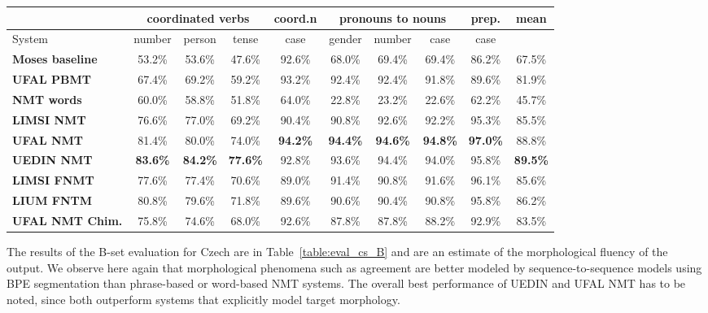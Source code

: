 \documentclass[11pt,letterpaper,final,nohyperref]{article}
\begin{document}
\begin{table*}[tb] %
\begin{center}
\small
\begin{tabular}{ l|ccc|c|ccc|c||c }
\hline
& \multicolumn{3}{c}{\textbf{coordinated verbs}} & \multicolumn{1}{c}{\textbf{coord.n}} & \multicolumn{3}{c}{\textbf{pronouns to nouns}} & \multicolumn{1}{c}{\textbf{prep.}} & \multicolumn{1}{c}{\textbf{mean}}\\
\hline
System & number & person & tense & case & gender & number & case & case & \\
\hline
\textbf{Moses baseline}  & 53.2\% & 53.6\% & 47.6\% & 92.6\% & 68.0\% & 69.4\% & 69.4\% & 86.2\% & 67.5\% \\
\textbf{UFAL PBMT}       & 67.4\% & 69.2\% & 59.2\% & 93.2\% & 92.4\% & 92.4\% & 91.8\% & 89.6\% & 81.9\% \\ 
\textbf{NMT words}       & 60.0\% & 58.8\% & 51.8\% & 64.0\% & 22.8\% & 23.2\% & 22.6\% & 62.2\% & 45.7\% \\
\textbf{LIMSI NMT}       & 76.6\% & 77.0\% & 69.2\% & 90.4\% & 90.8\% & 92.6\% & 92.2\% & 95.3\% & 85.5\% \\
\textbf{UFAL NMT}        & 81.4\% & 80.0\% & 74.0\% & \textbf{94.2\%} & \textbf{94.4\%} & \textbf{94.6\%} & \textbf{94.8\%} & \textbf{97.0\%} & 88.8\% \\
\textbf{UEDIN NMT}       & \textbf{83.6\%} & \textbf{84.2\%} & \textbf{77.6\%} & 92.8\% & 93.6\% & 94.4\% & 94.0\% & 95.8\% & \textbf{89.5\%} \\
\textbf{LIMSI FNMT}      & 77.6\% & 77.4\% & 70.6\% & 89.0\% & 91.4\% & 90.8\% & 91.6\% & 96.1\% & 85.6\% \\
\textbf{LIUM FNTM}       & 80.8\% & 79.6\% & 71.8\% & 89.6\% & 90.6\% & 90.4\% & 90.8\% & 95.8\% & 86.2\% \\
\textbf{UFAL NMT Chim.}  & 75.8\% & 74.6\% & 68.0\% & 92.6\% & 87.8\% & 87.8\% & 88.2\% & 92.9\% & 83.5\% \\
\hline
 \end{tabular} 
\caption{\label{table:eval_cs_B} Sentence pair evaluation for English-to-Czech (B-set).}
\end{center}
\end{table*}


The results of the B-set evaluation for Czech are in Table~\ref{table:eval_cs_B}
and are an estimate of the morphological fluency of the output. We observe here again
that morphological phenomena such as agreement are better modeled by sequence-to-sequence models
using BPE segmentation than phrase-based or word-based NMT systems.
The overall best
performance of UEDIN and UFAL NMT has to be noted, since both outperform systems that explicitly model target
morphology.
\end{document}
